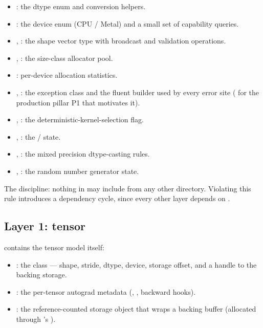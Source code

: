 \begin{itemize}
  \item {}: the dtype enum and conversion helpers.
  \item {}: the device enum (CPU / Metal) and a small
    set of capability queries.
  \item {}, : the shape vector type
    with broadcast and validation operations.
  \item {}, : the size-class
    allocator pool.
  \item {}: per-device allocation statistics.
  \item {}, : the
     exception class and the fluent builder used
    by every error site ( for the production
    pillar P1 that motivates it).
  \item {}, : the
    deterministic-kernel-selection flag.
  \item {}, : the
     /  state.
  \item {}, : the mixed
    precision dtype-casting rules.
  \item {}, : the random
    number generator state.
\end{itemize}

The discipline: nothing in  may include from any other
 directory. Violating this rule introduces a
dependency cycle, since every other layer depends on .

\subsection{Layer 1: tensor}
\label{ssec:layered_dag:tensor}

 contains the tensor model itself:

\begin{itemize}
  \item {}: the  class --- shape,
    stride, dtype, device, storage offset, and a handle to the
    backing storage.
  \item {}: the per-tensor autograd metadata
    (, , backward hooks).
  \item {}: the reference-counted storage object
    that wraps a backing buffer (allocated through 's
    ).
\end{itemize}

